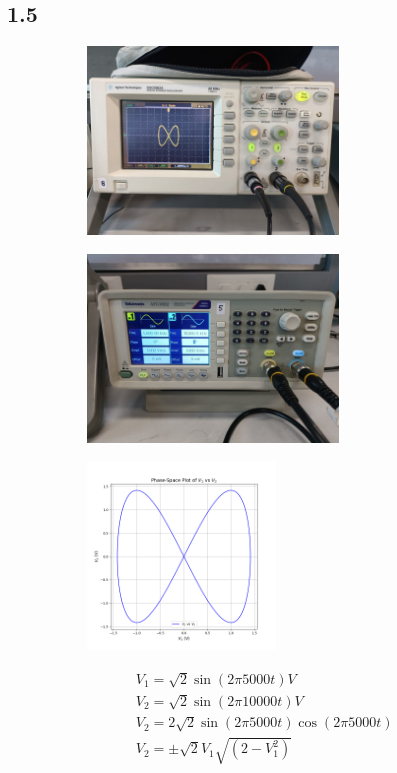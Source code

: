 \documentclass[a4paper,12pt]{article}
\begin{document}
\subsection*{1.5}
\begin{figure}[H]
    \centering
    \begin{subfigure}{0.5\textwidth}
        \centering
        \includegraphics[height=5cm]{figs/5/plot.jpeg}
    \end{subfigure}%
    \begin{subfigure}{0.5\textwidth}
        \centering
        \includegraphics[height=5cm]{figs/5/para.jpeg}
    \end{subfigure}
    \begin{subfigure}{0.5\textwidth}
        \centering
        \includegraphics[height=5cm]{figs/5/pyplot.png}
    \end{subfigure}%
\end{figure}
\begin{align}
    &V_1=\sqrt{2}\sin(2\pi 5000t) V\\
    &V_2=\sqrt{2}\sin(2\pi 10000t) V\\
    &V_2=2\sqrt{2}\sin(2\pi 5000t)\cos(2\pi 5000t)\\
    &V_2=\pm\sqrt{2}V_1\sqrt{(2-V_1^2)}
\end{align}
\end{document}
